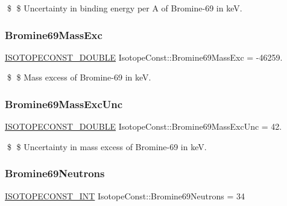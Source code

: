 \$ \$ Uncertainty in binding energy per A of Bromine-\/69 in keV. \mbox{\label{group___isotope_const-_bromine-_br69_ga82f499cd47727569b32774b888214950}} 
\subsubsection{\texorpdfstring{Bromine69\+Mass\+Exc}{Bromine69MassExc}}
{\footnotesize\ttfamily \mbox{\hyperlink{group___isotope_const-_macros_ga8f45a7272ce02c0b4c65c44636ed719a}{I\+S\+O\+T\+O\+P\+E\+C\+O\+N\+S\+T\+\_\+\+D\+O\+U\+B\+LE}} Isotope\+Const\+::\+Bromine69\+Mass\+Exc = -\/46259.}

\$ \$ Mass excess of Bromine-\/69 in keV. \mbox{\label{group___isotope_const-_bromine-_br69_gae0127415d491404e24ffe682d15ed009}} 
\subsubsection{\texorpdfstring{Bromine69\+Mass\+Exc\+Unc}{Bromine69MassExcUnc}}
{\footnotesize\ttfamily \mbox{\hyperlink{group___isotope_const-_macros_ga8f45a7272ce02c0b4c65c44636ed719a}{I\+S\+O\+T\+O\+P\+E\+C\+O\+N\+S\+T\+\_\+\+D\+O\+U\+B\+LE}} Isotope\+Const\+::\+Bromine69\+Mass\+Exc\+Unc = 42.}

\$ \$ Uncertainty in mass excess of Bromine-\/69 in keV. \mbox{\label{group___isotope_const-_bromine-_br69_ga08d0b6562bf87e6f8fb09f07b8b92cb9}} 
\subsubsection{\texorpdfstring{Bromine69\+Neutrons}{Bromine69Neutrons}}
{\footnotesize\ttfamily \mbox{\hyperlink{group___isotope_const-_macros_ga5f18360b3e99483a35c32d789e62621c}{I\+S\+O\+T\+O\+P\+E\+C\+O\+N\+S\+T\+\_\+\+I\+NT}} Isotope\+Const\+::\+Bromine69\+Neutrons = 34}

